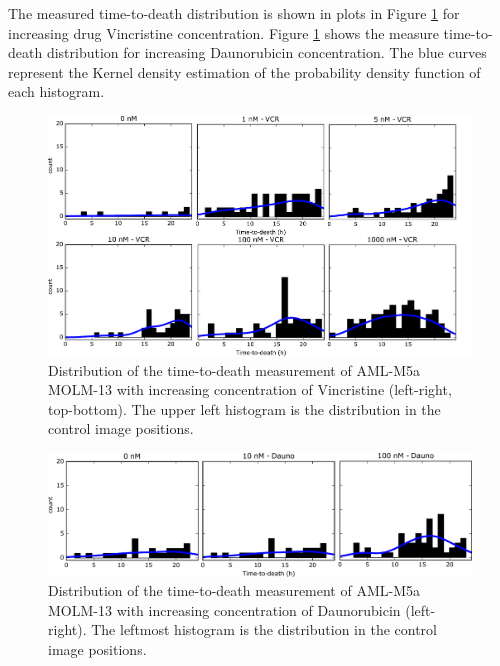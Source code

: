 \documentclass[pdftex,12pt,a4paper]{report}
\begin{document}
The measured time-to-death distribution is shown in plots in Figure \ref{fig:ttd_hist_vcr} for increasing drug Vincristine concentration. Figure \ref{fig:ttd_hist_vcr} shows the measure time-to-death distribution for increasing Daunorubicin concentration. The blue curves represent the Kernel density estimation of the probability density function of each histogram.

\begin{figure}[H]
\centering
\includegraphics[width=\textwidth]{images/ttd/unsyn/vcr_all.pdf}
\caption[Distribution of TTD for every Vincristine concentration in the synchronized experiment]{Distribution of the time-to-death measurement of AML-M5a MOLM-13 with increasing concentration of Vincristine (left-right, top-bottom). The upper left histogram is the distribution in the control image positions.}
\label{fig:ttd_hist_vcr}
\end{figure}

\begin{figure}[H]
\centering
\includegraphics[width=\textwidth]{images/ttd/unsyn/dauno_all.pdf}
\caption[Distribution of TTD for every Daunorubicin concentration in the synchronized experiment]{Distribution of the time-to-death measurement of AML-M5a MOLM-13 with increasing concentration of Daunorubicin (left-right). The leftmost histogram is the distribution in the control image positions.}
\label{fig:ttd_hist_dauno}
\end{figure}
\end{document}

